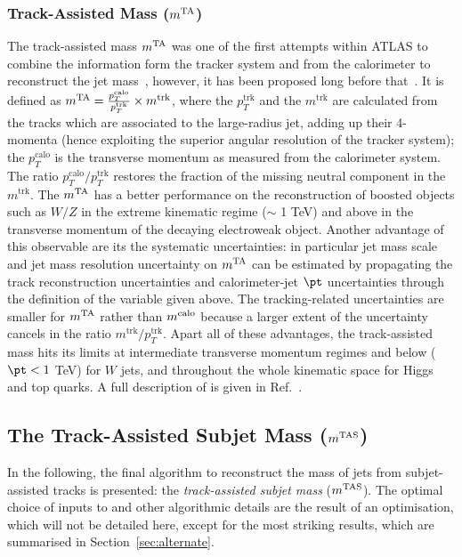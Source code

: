\subsubsection{Track-Assisted Mass ($m^\textrm{TA}$)}
The track-assisted mass $m^\textrm{TA}$ was one of the first attempts within ATLAS to combine the information form the tracker system and from the calorimeter to reconstruct the \larger jet mass~\cite{art35}, however, it has been proposed long before that~\cite{bib:schaetzel,bib:tweedie}. It is defined as $m^\textrm{TA}=\frac{p_T^\textrm{calo}}{p_T^\textrm{trk}}\times m^\textrm{trk}$, where the $p_T^\textrm{trk}$ and the $m^\textrm{trk}$ are calculated from the tracks which are associated to the large-radius jet, adding up their 4-momenta (hence exploiting the superior angular resolution of the tracker system); the $p_T^\textrm{calo}$ is the transverse momentum as measured from the calorimeter system. The ratio $p_T^\textrm{calo}/p_T^\textrm{trk}$ restores the fraction of the missing neutral component in the $m^\textrm{trk}$.
The $m^\textrm{TA}$ has a better performance on the reconstruction of boosted objects such as $W/Z$ in the extreme kinematic regime ($\sim $ 1 TeV) and above in the transverse momentum of the decaying electroweak object. Another advantage of this observable are its the systematic uncertainties: in particular jet mass scale and jet mass resolution uncertainty on $m^\textrm{TA}$ can be estimated by propagating the track reconstruction uncertainties and calorimeter-jet $\pt$ uncertainties through the definition of the variable given above. The tracking-related uncertainties are smaller for $m^\textrm{TA}$ rather than $m^\textrm{calo}$ because a larger extent of the uncertainty cancels in the ratio $m^\textrm{trk}/p_T^\textrm{trk}$.
Apart all of these advantages, the track-assisted mass hits its limits at intermediate transverse momentum regimes and below ($\pt < 1 $ TeV) for $W$ jets,  and throughout the whole kinematic space for Higgs and top quarks.
A full description of \mta is given in Ref.~\cite{art35}.



\subsection{The Track-Assisted Subjet Mass ($m^\textrm{TAS}$)}\label{subsec:mtas_def}
In the following, the final algorithm to reconstruct the mass of \larger jets from subjet-assisted tracks is presented: the \textit{track-assisted subjet mass} ($m^\textrm{TAS}$). The optimal choice of inputs to \mtas and other algorithmic details are the result of an optimisation, which will not be detailed here, except for the most striking results, which are summarised in Section~\ref{sec:alternate}.

